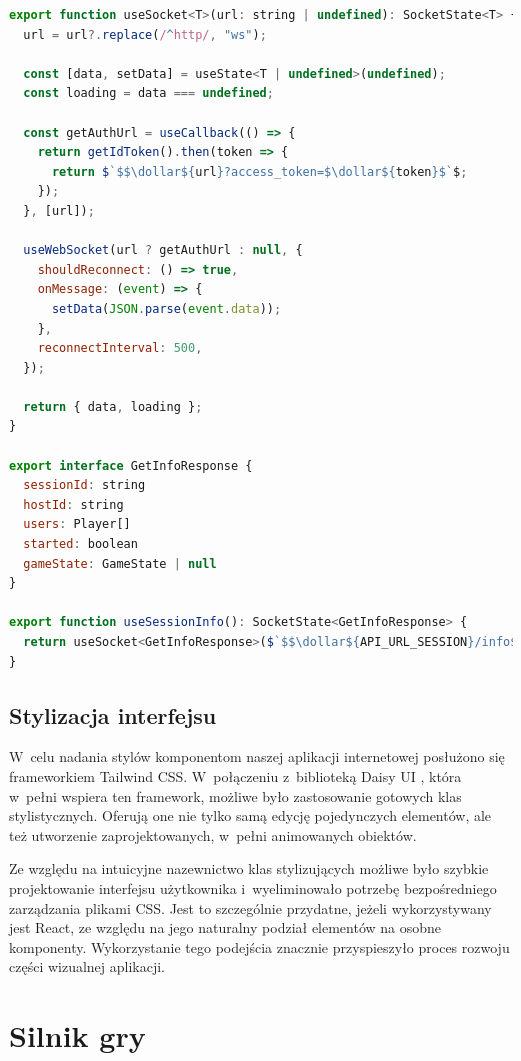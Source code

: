 \begin{lstlisting}[language=JavaScript, caption=Hooki z WebSocketem, label={lst:websocket-hooks}, captionpos=b]
export function useSocket<T>(url: string | undefined): SocketState<T> {
  url = url?.replace(/^http/, "ws");

  const [data, setData] = useState<T | undefined>(undefined);
  const loading = data === undefined;

  const getAuthUrl = useCallback(() => {
    return getIdToken().then(token => {
      return $`$$\dollar${url}?access_token=$\dollar${token}$`$;
    });
  }, [url]);

  useWebSocket(url ? getAuthUrl : null, {
    shouldReconnect: () => true,
    onMessage: (event) => {
      setData(JSON.parse(event.data));
    },
    reconnectInterval: 500,
  });

  return { data, loading };
}  

export interface GetInfoResponse {
  sessionId: string
  hostId: string
  users: Player[]
  started: boolean
  gameState: GameState | null
}

export function useSessionInfo(): SocketState<GetInfoResponse> {
  return useSocket<GetInfoResponse>($`$$\dollar${API_URL_SESSION}/info$`$);
}

\end{lstlisting}

\subsection{Stylizacja interfejsu}
W~celu nadania stylów komponentom naszej aplikacji internetowej posłużono się
frameworkiem Tailwind CSS. W~połączeniu z~biblioteką Daisy UI
\cite{DaisyUI}, która
w~pełni wspiera ten framework, możliwe było zastosowanie gotowych klas
stylistycznych. Oferują one nie tylko samą edycję pojedynczych elementów, ale też
utworzenie zaprojektowanych, w~pełni animowanych obiektów.

Ze względu na intuicyjne nazewnictwo klas stylizujących możliwe było szybkie
projektowanie interfejsu użytkownika i~wyeliminowało
potrzebę bezpośredniego zarządzania plikami CSS. Jest to szczególnie
przydatne, jeżeli wykorzystywany jest React, ze względu na jego naturalny podział
elementów na osobne komponenty. Wykorzystanie tego podejścia znacznie przyspieszyło
proces rozwoju części wizualnej aplikacji.


\section{Silnik gry}
\label{subsec:silnik_gry}

